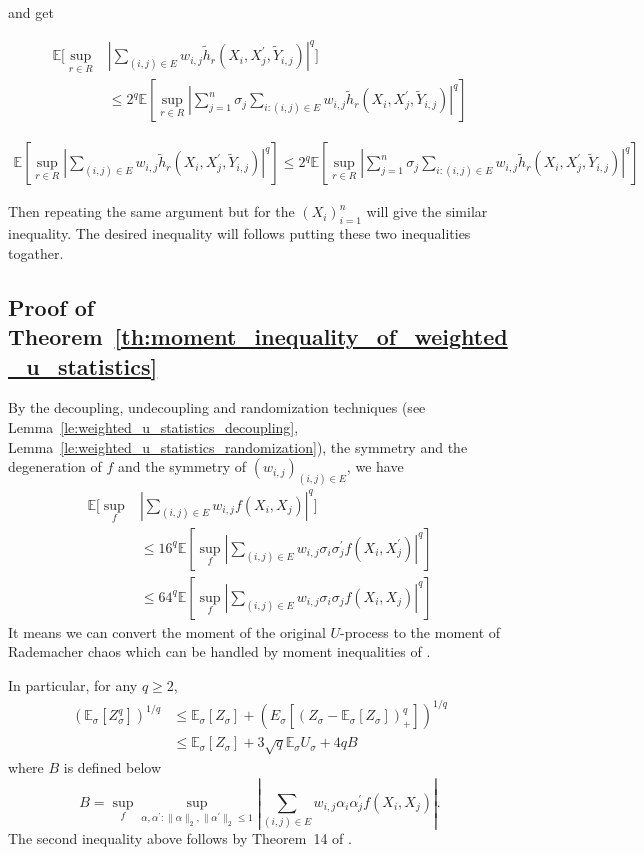 \documentclass[letterpaper]{article} %
\def\DoubleColumn{}
\def\DoubleColumnEnd{}
\def\SingleColumn{}
\def\SingleColumnEnd{}
\newcommand{\E}{\mathbb{E}}
\newcommand{\rademacher}{\sigma}
\newcommand{\pair}[1]{(#1)}
\begin{document}
\SingleColumnEnd
and get
\DoubleColumn
\begin{align*}
    \E[\sup_{r\in R}&|\sum_{\pair{i,j}\in E} w_{i,j}\tilde{h}_r(X_i,X_j^\prime,\tilde{Y}_{i,j})|^q] \\
    &\le 2^q\E[\sup_{r\in R}|\sum_{j=1}^n\sigma_j\sum_{i:\pair{i,j}\in E}w_{i,j} \tilde{h}_r(X_i,X_j^\prime,\tilde{Y}_{i,j})|^q]
\end{align*}
\DoubleColumnEnd
\SingleColumn
\begin{align*}
    \E[\sup_{r\in R}|\sum_{\pair{i,j}\in E} w_{i,j}\tilde{h}_r(X_i,X_j^\prime,\tilde{Y}_{i,j})|^q] \le 2^q\E[\sup_{r\in R}|\sum_{j=1}^n\sigma_j\sum_{i:\pair{i,j}\in E}w_{i,j} \tilde{h}_r(X_i,X_j^\prime,\tilde{Y}_{i,j})|^q]
\end{align*}
\SingleColumnEnd
Then repeating the same argument but for the $(X_i)_{i=1}^n$ will give the similar inequality. The desired inequality will follows putting these two inequalities togather.

\subsection{Proof of Theorem~\ref{th:moment_inequality_of_weighted_u_statistics}} %
\label{sub:proof_of_theorem_}

By the decoupling, undecoupling and randomization techniques (see Lemma~\ref{le:weighted_u_statistics_decoupling}, Lemma~\ref{le:weighted_u_statistics_randomization}), the symmetry and the degeneration of $f$ and the symmetry of $(w_{i,j})_{\pair{i,j}\in E}$, we have
\begin{align*}
    \E[\sup_f&|\sum_{\pair{i,j}\in E}w_{i,j} f(X_i,X_j)|^q]\\
    &\le 16^q\E[\sup_f|\sum_{\pair{i,j}\in E}w_{i,j}\rademacher_i\rademacher_j^\prime f(X_i, X_j^\prime)|^q]\\
    &\le 64^q\E[\sup_f|\sum_{\pair{i,j}\in E}w_{i,j}\rademacher_i\rademacher_j f(X_i, X_j)|^q]
\end{align*}
It means we can convert the moment of the original $U$-process to the moment of Rademacher chaos which can be handled by moment inequalities of \cite{Boucheron2005}.

In particular, for any $q\ge 2$,
\begin{align*}
    (\E_\rademacher[Z_\rademacher^q])^{1/q}
    &\le \E_\rademacher[Z_\rademacher] + (E_\rademacher[(Z_\rademacher-\E_\rademacher[Z_\rademacher])_+^q])^{1/q}\\
    &\le \E_\rademacher[Z_\rademacher]+3\sqrt{q}\E_\rademacher U_\rademacher + 4qB
\end{align*}
where $B$ is defined below
\[B=\sup_f\sup_{\alpha,\alpha^\prime:\|\alpha\|_2,\|\alpha^\prime\|_2\le 1}|\sum_{\pair{i,j}\in E}w_{i,j}\alpha_i\alpha_j^\prime f(X_i,X_j)|.\]
The second inequality above follows by Theorem~14 of \cite{Boucheron2005}.
\end{document}
